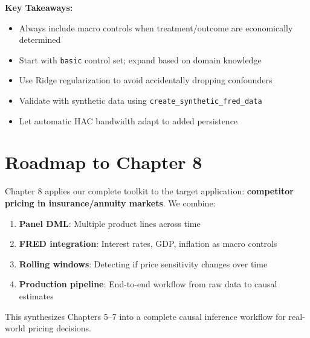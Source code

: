 \textbf{Key Takeaways:}
\begin{itemize}
    \item Always include macro controls when treatment/outcome are economically determined
    \item Start with \texttt{basic} control set; expand based on domain knowledge
    \item Use Ridge regularization to avoid accidentally dropping confounders
    \item Validate with synthetic data using \texttt{create\_synthetic\_fred\_data}
    \item Let automatic HAC bandwidth adapt to added persistence
\end{itemize}

\section{Roadmap to Chapter 8}\label{sec:roadmap_ch07}

Chapter 8 applies our complete toolkit to the target application: \textbf{competitor pricing in insurance/annuity markets}. We combine:

\begin{enumerate}
    \item \textbf{Panel DML}: Multiple product lines across time
    \item \textbf{FRED integration}: Interest rates, GDP, inflation as macro controls
    \item \textbf{Rolling windows}: Detecting if price sensitivity changes over time
    \item \textbf{Production pipeline}: End-to-end workflow from raw data to causal estimates
\end{enumerate}

This synthesizes Chapters 5--7 into a complete causal inference workflow for real-world pricing decisions.
